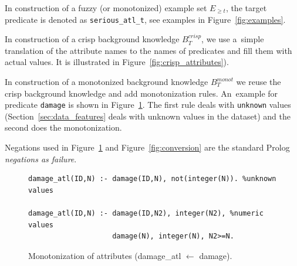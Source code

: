 In construction of a fuzzy (or monotonized) example set $E_{\ge t}$, the target predicate is denoted as \texttt{serious\_atl\_t}, see examples in Figure~\ref{fig:examples}.



In construction of a crisp background knowledge $B^{crisp}_{T}$, we use a~simple translation of the attribute names to the names of predicates and fill them with actual values. It is illustrated in Figure~\ref{fig:crisp_attributes}). 



In construction of a monotonized background knowledge $B^{monot}_T$ we reuse the crisp background knowledge and add monotonization rules. An~example for predicate \texttt{damage} is shown in Figure~\ref{fig:attribute_monotonization}.
The first rule deals with \texttt{unknown} values (Section~\ref{sec:data_features} deals with unknown values in the dataset) and the second does the monotonization. 

Negations used in Figure~\ref{fig:attribute_monotonization} and Figure~\ref{fig:conversion} are the standard Prolog \emph{negations as failure}.



\begin{figure}	
\begin{verbatim}
damage_atl(ID,N) :- damage(ID,N), not(integer(N)). %unknown values

damage_atl(ID,N) :- damage(ID,N2), integer(N2), %numeric values
                    damage(N), integer(N), N2>=N.
\end{verbatim}						
	\caption{Monotonization of attributes (damage\_atl $\leftarrow$ damage).}
	\label{fig:attribute_monotonization}
\end{figure}


